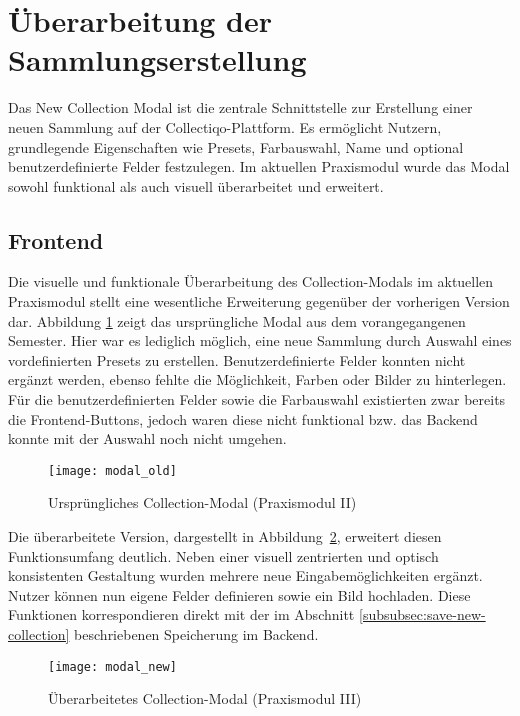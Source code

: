 \section{Überarbeitung der Sammlungserstellung}\label{sec:uberarbeitung-der-sammlungserstellung}

Das New Collection Modal ist die zentrale Schnittstelle zur Erstellung einer neuen Sammlung auf der Collectiqo-Plattform.
Es ermöglicht Nutzern, grundlegende Eigenschaften wie Presets, Farbauswahl, Name und optional benutzerdefinierte Felder festzulegen.
Im aktuellen Praxismodul wurde das Modal sowohl funktional als auch visuell überarbeitet und erweitert.

\subsection{Frontend}\label{subsec:new-collection-frontend}

Die visuelle und funktionale Überarbeitung des Collection-Modals im aktuellen Praxismodul stellt eine wesentliche Erweiterung gegenüber der vorherigen Version dar.
Abbildung \ref{fig:modal-old} zeigt das ursprüngliche Modal aus dem vorangegangenen Semester.
Hier war es lediglich möglich, eine neue Sammlung durch Auswahl eines vordefinierten Presets zu erstellen.
Benutzerdefinierte Felder konnten nicht ergänzt werden, ebenso fehlte die Möglichkeit, Farben oder Bilder zu hinterlegen.
Für die benutzerdefinierten Felder sowie die Farbauswahl existierten zwar bereits die Frontend-Buttons, jedoch waren diese nicht funktional bzw. das Backend konnte mit der Auswahl noch nicht umgehen.

\begin{figure}[H]
    \centering
    \texttt{[image: modal\_old]}
    \caption{Ursprüngliches Collection-Modal (Praxismodul II)}
    \label{fig:modal-old}
\end{figure}

Die überarbeitete Version, dargestellt in Abbildung~\ref{fig:modal-new}, erweitert diesen Funktionsumfang deutlich.
Neben einer visuell zentrierten und optisch konsistenten Gestaltung wurden mehrere neue Eingabemöglichkeiten ergänzt.
Nutzer können nun eigene Felder definieren sowie ein Bild hochladen.
Diese Funktionen korrespondieren direkt mit der im Abschnitt \ref{subsubsec:save-new-collection} beschriebenen Speicherung im Backend.

\begin{figure}[H]
    \centering
    \texttt{[image: modal\_new]}
    \caption{Überarbeitetes Collection-Modal (Praxismodul III)}
    \label{fig:modal-new}
\end{figure}

